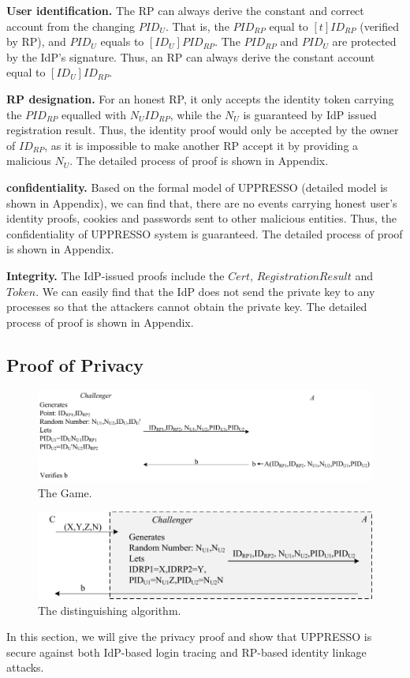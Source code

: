 \noindent\textbf{User identification.}
The RP can always derive the constant and correct account from the changing $PID_U$. That is, the $PID_{RP}$ equal to $[t]ID_{RP}$ (verified by RP), and $PID_U$ equals to $[ID_U]PID_{RP}$. The $PID_{RP}$ and $PID_U$ are protected by the IdP's signature.
Thus, an RP can always derive the constant account equal to $[ID_U]ID_{RP}$.

\noindent\textbf{RP designation.}
For an honest RP, it only accepts the identity token carrying the $PID_{RP}$ equalled with $N_UID_{RP}$, while the $N_U$ is guaranteed by IdP issued registration result. Thus, the identity proof would only be accepted by the owner of $ID_{RP}$, as it is impossible to make another RP accept it by providing a malicious $N_U$. The detailed process of proof is shown in Appendix.

\noindent\textbf{confidentiality.}
Based on the formal model of UPPRESSO (detailed model is shown in Appendix), we can find that, there are no events carrying honest user's identity proofs, cookies and passwords sent to other malicious entities. Thus, the confidentiality of UPPRESSO system is guaranteed. The detailed process of proof is shown in Appendix.

\noindent\textbf{Integrity.}
The IdP-issued proofs include the $Cert$, $RegistrationResult$ and $Token$. We can easily find that the IdP does not send the private key to any processes so that the attackers cannot obtain the private key. The detailed process of proof is shown in Appendix.



\subsection{Proof of Privacy}
\label{sec:analysis}
\begin{figure}
  \centering
  \includegraphics[width=0.82\linewidth]{fig/game1.pdf}
  \caption{The Game.}
  \label{fig:game}
\end{figure}

\begin{figure}
  \centering
  \includegraphics[width=0.65\linewidth]{fig/dalgorithm.pdf}
  \caption{The distinguishing algorithm.}
  \label{fig:dalgorithm}
\end{figure}
In this section, we will give the privacy proof and show that UPPRESSO is secure against both IdP-based login tracing and RP-based identity linkage attacks.

